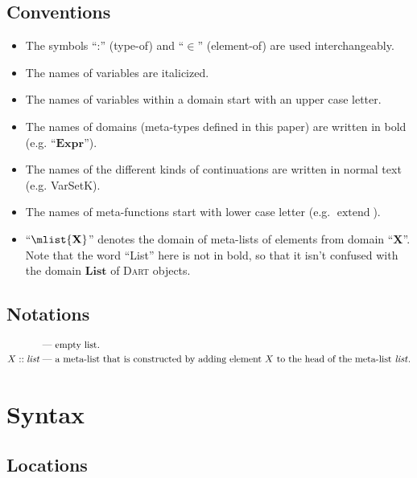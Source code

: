 \documentclass[a4paper,oneside]{article}
\newcommand{\dart}{\textsc{Dart}}
\DeclareMathOperator{\extend}{extend}
\begin{document}
\subsection{Conventions}
\label{subsec:conventions}

\begin{itemize}
    \item The symbols ``:'' (type-of) and ``$\in$'' (element-of) are used interchangeably.
    \item The names of variables are italicized.
    \item The names of variables within a domain start with an upper case letter.
    \item The names of domains (meta-types defined in this paper) are written in bold (e.g. ``$\mathbf{Expr}$'').
    \item The names of the different kinds of continuations are written in normal text (e.g. VarSetK).
    \item The names of meta-functions start with lower case letter (e.g. $\extend$).
    \item ``$\mlist{\mathbf{X}}$'' denotes the domain of meta-lists of elements from domain ``$\mathbf{X}$''.
        Note that the word ``List'' here is not in bold, so that it isn't confused with the domain $\mathbf{List}$ of \dart{} objects.
\end{itemize}

\subsection{Notations}
\label{subsec:notations}

\begin{align*}
    [] &\text{ --- empty list}.\\
    X :: \textit{list} &\text{ --- a meta-list that is constructed by adding element $X$ to the head of the meta-list \textit{list}}.
\end{align*}

\section{Syntax}
\label{sec:definitions}

\subsection{Locations}
\newcommand{\dlocation}{\mathbf{Location}}
\newcommand{\loc}{\ensuremath{\alpha}}
\end{document}
